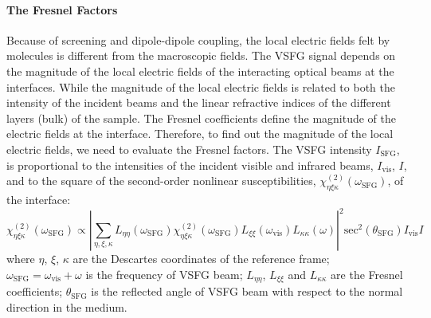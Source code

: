 \paragraph{The Fresnel Factors}
Because of screening and dipole-dipole coupling, the local electric fields felt by molecules is different from the macroscopic fields\cite{Vanselow2012}. 
The VSFG signal depends on the magnitude of the local electric fields of the interacting optical beams at the interfaces. 
While the magnitude of the local electric fields is related to both the intensity of the incident beams and the linear refractive indices 
of the different layers (bulk) of the sample\cite{Khatib16}. The Fresnel coefficients define the magnitude of the electric fields at the interface. 
Therefore, to find out the magnitude of the local electric fields, we need to evaluate the Fresnel factors. 
The VSFG intensity $I_{\text{SFG}}$, is proportional to the intensities of the incident visible and infrared beams, $I_{\text{vis}}$, $I$, 
and to the square of the second-order nonlinear susceptibilities,
$\chi_{\eta\xi\kappa}^{(2)}(\omega_{\text{SFG}})$, of the interface:
\begin{equation}
        \chi_{\eta\xi\kappa}^{(2)}(\omega_{\text{SFG}})\propto|\sum_{\eta,\xi,\kappa}L_{\eta\eta}(\omega_{\text{SFG}})\chi_{\eta\xi\kappa}^{(2)}(\omega_{\text{SFG}})L_{\xi\xi}(\omega_{\text{vis}})L_{\kappa\kappa}(\omega)|^2\text{sec}^2(\theta_{\text{SFG}})I_{\text{vis}}I
\label{eq:chi}
\end{equation}
where $\eta$, $\xi$, $\kappa$ are the Descartes coordinates of the reference frame;
$\omega_{\text{SFG}}=\omega_{\text{vis}}+\omega$ is the frequency of VSFG beam; 
$L_{\eta\eta}$, $L_{\xi\xi}$ and $L_{\kappa\kappa}$ are the Fresnel coefficients; 
$\theta_{\text{SFG}}$ is the reflected angle of VSFG beam with respect to the normal 
direction in the medium.

